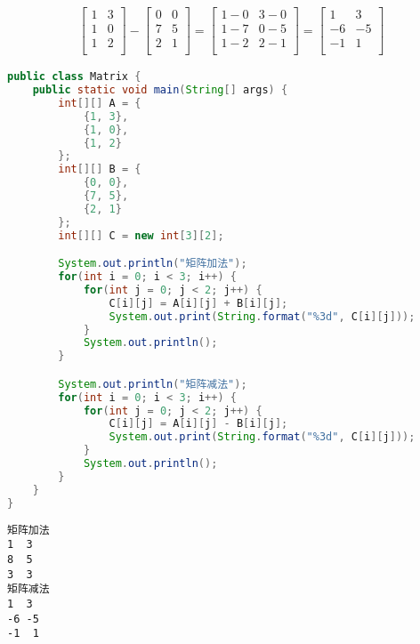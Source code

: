 \begin{align}\nonumber
	\left[\begin{matrix}
			1 & 3 \\
			1 & 0 \\
			1 & 2 \\
		\end{matrix} \right]
	-
	\left[\begin{matrix}
			0 & 0 \\
			7 & 5 \\
			2 & 1 \\
		\end{matrix} \right]
	=
	\left[\begin{matrix}
			1-0 & 3-0 \\
			1-7 & 0-5 \\
			1-2 & 2-1 \\
		\end{matrix} \right]
	=
	\left[\begin{matrix}
			1  & 3  \\
			-6 & -5 \\
			-1 & 1  \\
		\end{matrix} \right]
\end{align}

\begin{lstlisting}[language=Java]
public class Matrix {
    public static void main(String[] args) {
        int[][] A = {
            {1, 3},
            {1, 0},
            {1, 2}
        };
        int[][] B = {
            {0, 0},
            {7, 5},
            {2, 1}
        };
        int[][] C = new int[3][2];

        System.out.println("矩阵加法");
        for(int i = 0; i < 3; i++) {
            for(int j = 0; j < 2; j++) {
                C[i][j] = A[i][j] + B[i][j];
                System.out.print(String.format("%3d", C[i][j]));
            }
            System.out.println();
        }

        System.out.println("矩阵减法");
        for(int i = 0; i < 3; i++) {
            for(int j = 0; j < 2; j++) {
                C[i][j] = A[i][j] - B[i][j];
                System.out.print(String.format("%3d", C[i][j]));
            }
            System.out.println();
        }
    }
}
\end{lstlisting}

\begin{tcolorbox}
	\begin{verbatim}
矩阵加法
1  3
8  5
3  3
矩阵减法
1  3
-6 -5
-1  1
	\end{verbatim}
\end{tcolorbox}

